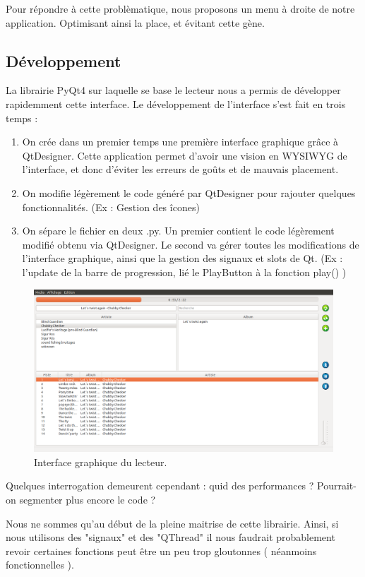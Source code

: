 \documentclass{report}
\begin{document}
Pour répondre à cette problèmatique, nous proposons un menu à droite de notre application. Optimisant ainsi la place, et évitant cette gène.

\subsection*{Développement}
La librairie PyQt4 sur laquelle se base le lecteur nous a permis de développer rapidemment cette interface. Le développement de l'interface s'est fait en trois temps :
\begin{enumerate}
\item On crée dans un premier temps une première interface graphique grâce à QtDesigner. Cette application permet d'avoir une vision en WYSIWYG de l'interface, et donc d'éviter les erreurs de goûts et de mauvais placement.
\item On modifie légèrement le code généré par QtDesigner pour rajouter quelques fonctionnalités. (Ex : Gestion des îcones)
\item On sépare le fichier en deux .py. Un premier contient le code légèrement modifié obtenu via QtDesigner. Le second va gérer toutes les modifications de l'interface graphique, ainsi que la gestion des signaux et slots de Qt. (Ex : l'update de la barre de progression, lié le PlayButton à la fonction play() )
\end{enumerate}

\begin{figure}[h]
\centering
\includegraphics[scale=.3]{interface.png}
\caption{Interface graphique du lecteur.}
\end{figure}

Quelques interrogation demeurent cependant : quid des performances ? Pourrait-on segmenter plus encore le code ?

Nous ne sommes qu'au début de la pleine maitrise de cette librairie. Ainsi, si nous utilisons des "signaux" et des "QThread" il nous faudrait probablement revoir certaines fonctions peut être un peu trop gloutonnes ( néanmoins fonctionnelles ).
\end{document}
